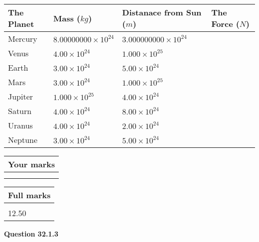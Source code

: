 \documentclass[12pt]{article}
\begin{document}
\vspace{0.2in}
 
 
\begin{tabular}{|l|l|l|l|}
\hline
The Planet & Mass ($kg$) & Distanace from Sun ($m$) & The Force ($N$)\\
\hline
Mercury  &
           $ %
8.00000000 \times 10^{24} $   &
             $ %
3.000000000 \times 10^{24} $    &
\\  \hline
Venus    &
           $ %
4.00 \times 10^{24} $    &
             $ %
1.000 \times 10^{25} $    &
\\  \hline
Earth    &
           $ %
3.00 \times 10^{24} $    &
             $ %
5.00 \times 10^{24} $    &
\\   \hline
Mars     &
           $ %
3.00 \times 10^{24} $    &
             $ %
1.000 \times 10^{25} $    &
\\   \hline
Jupiter  &
           $ %
1.000 \times 10^{25} $    &
             $ %
4.00 \times 10^{24} $    &
\\  \hline
Saturn   &
           $ %
4.00 \times 10^{24}$    &
             $ %
8.00 \times 10^{24}$    &
\\  \hline
Uranus   &
           $ %
4.00 \times 10^{24} $    &
             $ %
2.00 \times 10^{24} $    &
\\  \hline
Neptune  &
           $ %
3.00 \times 10^{24} $    &
             $ %
5.00 \times 10^{24} $    &
\\  \hline
 
\end{tabular}
 
 

 
 

 
\vspace{0.3in}
  
\vspace{0.2in}
  
         \begin{tabular}{|l|}
\hline
 Your marks  \\
\hline
 \\ 
 \\ 
\hline
\end{tabular}
\hspace{0.05in} \begin{tabular}{|l|}
\hline
 Full marks  \\
\hline
 \\ 
12.50 \\
\hline
\end{tabular}
{\textbf{\Large{Question
32.1.3 
}}}
  
\end{document}
